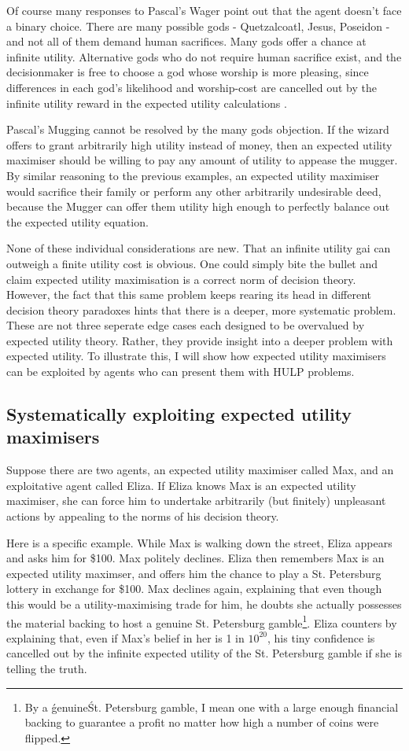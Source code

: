 \documentclass{article}
\begin{document}
Of course many responses to Pascal's Wager point out that the agent doesn't face a binary choice. There are many possible gods - Quetzalcoatl, Jesus, Poseidon - and not all of them demand human sacrifices. Many gods offer a chance at infinite utility. Alternative gods who do not require human sacrifice exist, and the decisionmaker is free to choose a god whose worship is more pleasing, since differences in each god's likelihood and worship-cost are cancelled out by the infinite utility reward in the expected utility calculations \citep{diderot1746pensees}.

Pascal's Mugging cannot be resolved by the many gods objection. If the wizard offers to grant arbitrarily high utility instead of money, then an expected utility maximiser should be willing to pay any amount of utility to appease the mugger. By similar reasoning to the previous examples, an expected utility maximiser would sacrifice their family or perform any other arbitrarily undesirable deed, because the Mugger can offer them utility high enough to perfectly balance out the expected utility equation.

None of these individual considerations are new. That an infinite utility gai can outweigh a finite utility cost is obvious. One could simply bite the bullet and claim expected utility maximisation is a correct norm of decision theory. However, the fact that this same problem keeps rearing its head in different decision theory paradoxes hints that there is a deeper, more systematic problem. These are not three seperate edge cases each designed to be overvalued by expected utility theory. Rather, they provide insight into a deeper problem with expected utility. To illustrate this, I will show how expected utility maximisers can be exploited by agents who can present them with HULP problems.

\subsection{Systematically exploiting expected utility maximisers}

Suppose there are two agents, an expected utility maximiser called Max, and an exploitative agent called Eliza. If Eliza knows Max is an expected utility maximiser, she can force him to undertake arbitrarily (but finitely) unpleasant actions by appealing to the norms of his decision theory. 

Here is a specific example. While Max is walking down the street, Eliza appears and asks him for \$100. Max politely declines. Eliza then remembers Max is an expected utility maximser, and offers him the chance to play a St. Petersburg lottery in exchange for \$100. Max declines again, explaining that even though this would be a utility-maximising trade for him, he doubts she actually possesses the material backing to host a genuine St. Petersburg gamble\footnote{By a \'genuine\' St. Petersburg gamble, I mean one with a large enough financial backing to guarantee a profit no matter how high a number of coins were flipped.}. Eliza counters by explaining that, even if Max's belief in her is 1 in \(10^{20}\), his tiny confidence is cancelled out by the infinite expected utility of the St. Petersburg gamble if she is telling the truth.
\end{document}

